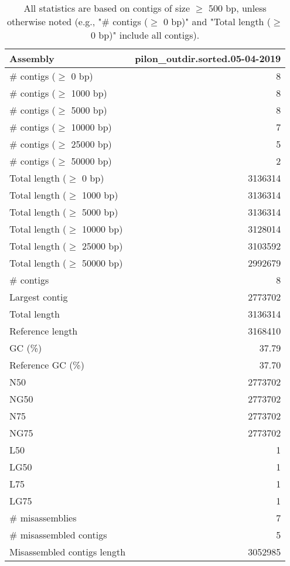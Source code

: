 \documentclass[12pt,a4paper]{article}
\begin{document}
\begin{table}[ht]
\begin{center}
\caption{All statistics are based on contigs of size $\geq$ 500 bp, unless otherwise noted (e.g., "\# contigs ($\geq$ 0 bp)" and "Total length ($\geq$ 0 bp)" include all contigs).}
\begin{tabular}{|l*{1}{|r}|}
\hline
Assembly & pilon\_outdir.sorted.05-04-2019 \\ \hline
\# contigs ($\geq$ 0 bp) & 8 \\ \hline
\# contigs ($\geq$ 1000 bp) & 8 \\ \hline
\# contigs ($\geq$ 5000 bp) & 8 \\ \hline
\# contigs ($\geq$ 10000 bp) & 7 \\ \hline
\# contigs ($\geq$ 25000 bp) & 5 \\ \hline
\# contigs ($\geq$ 50000 bp) & 2 \\ \hline
Total length ($\geq$ 0 bp) & 3136314 \\ \hline
Total length ($\geq$ 1000 bp) & 3136314 \\ \hline
Total length ($\geq$ 5000 bp) & 3136314 \\ \hline
Total length ($\geq$ 10000 bp) & 3128014 \\ \hline
Total length ($\geq$ 25000 bp) & 3103592 \\ \hline
Total length ($\geq$ 50000 bp) & 2992679 \\ \hline
\# contigs & 8 \\ \hline
Largest contig & 2773702 \\ \hline
Total length & 3136314 \\ \hline
Reference length & 3168410 \\ \hline
GC (\%) & 37.79 \\ \hline
Reference GC (\%) & 37.70 \\ \hline
N50 & 2773702 \\ \hline
NG50 & 2773702 \\ \hline
N75 & 2773702 \\ \hline
NG75 & 2773702 \\ \hline
L50 & 1 \\ \hline
LG50 & 1 \\ \hline
L75 & 1 \\ \hline
LG75 & 1 \\ \hline
\# misassemblies & 7 \\ \hline
\# misassembled contigs & 5 \\ \hline
Misassembled contigs length & 3052985 \\ \hline

\end{tabular}
\end{center}
\end{table}
\end{document}
